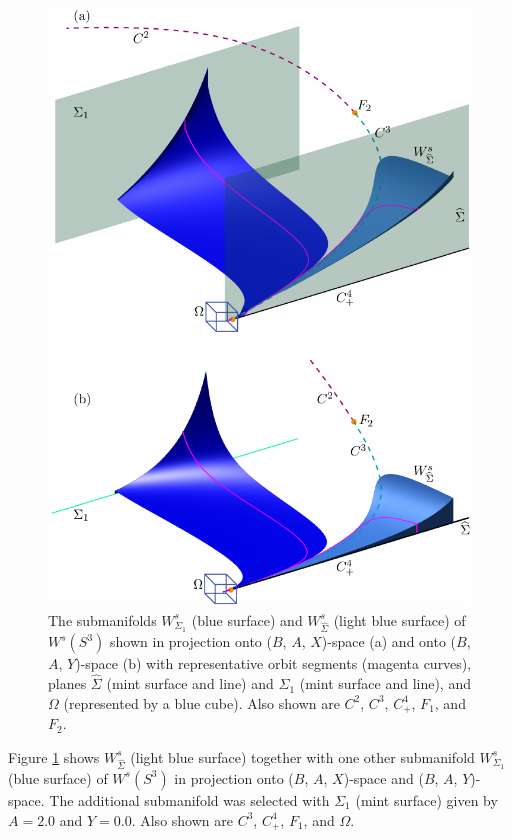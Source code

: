 \documentclass{ws-ijbc}
\begin{document}
\begin{figure}[H]
\centering
\includegraphics[]{./figures/MKMO_5.pdf}
\caption{The submanifolds $W^{s}_{\Sigma_1}$ (blue surface) and $W^{s}_{\widehat{\Sigma}}$ (light blue surface) of $W^s(S^3)$ shown in projection onto ($B$, $A$, $X$)-space (a) and onto ($B$, $A$, $Y$)-space (b) with representative orbit segments (magenta curves), planes $\widehat{\Sigma}$ (mint surface and line) and $\Sigma_1$ (mint surface and line), and $\Omega$ (represented by a blue cube).  Also shown are $C^2$, $C^3$, $C^4_+$, $F_1$, and $F_2$.}
\label{figure_5}
\end{figure}

Figure \ref{figure_5} shows $W^s_{\widehat{\Sigma}}$ (light blue surface) together with one other submanifold $W^{s}_{\Sigma_1}$ (blue surface) of $W^{s}(S^3)$ in projection onto ($B$, $A$, $X$)-space and ($B$, $A$, $Y$)-space.  The additional submanifold was selected with $\Sigma_1$ (mint surface) given by $A=2.0$ and $Y=0.0$.  Also shown are $C^3$, $C^4_+$, $F_1$, and $\Omega$.
\end{document}

